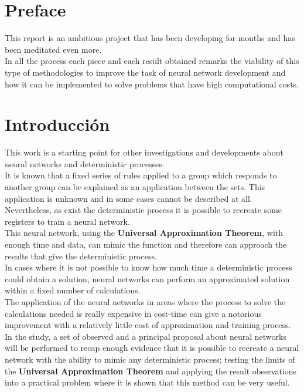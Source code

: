 \documentclass[a4paper, 11pt]{article}
\begin{document}
\tableofcontents
\listoffigures
\listoftables

\newpage
\section*{Preface}
This report is an ambitious project that has been developing for months and has been meditated even more.\\
In all the process each piece and each result obtained remarks the viability of this type of methodologies to improve the task of neural network development and how it can be implemented to solve problems that have high computational costs.

\newpage \pagestyle{extended_plain}
\setcounter{page}{2}
\section*{Introducción}
This work is a starting point for other investigations and developments about neural networks and deterministic processes.\\
It is known that a fixed series of rules applied to a group which responds to another group can be explained as an application between the sets.
This application is unknown and in some cases cannot be described at all. Nevertheless, as exist the deterministic process it is possible to recreate some registers to train a neural network.\\
This neural network, using the \textbf{Universal Approximation Theorem}, with enough time and data, can mimic the function and therefore can approach the results that give the deterministic process.\\
In cases where it is not possible to know how much time a deterministic process could obtain a solution, neural networks can perform an approximated solution within a fixed number of calculations.\\
The application of the neural networks in areas where the process to solve the calculations needed is really expensive in cost-time can give a notorious improvement with a relatively little cost of approximation and training process.\\
In the study, a set of observed and a principal proposal about neural networks will be performed to recap enough evidence that it is possible to recreate a neural network with the ability to mimic any deterministic process; testing the limits of the \textbf{Universal Approximation Theorem} and applying the result observations into a practical problem where it is shown that this method can be very useful.
\end{document}
